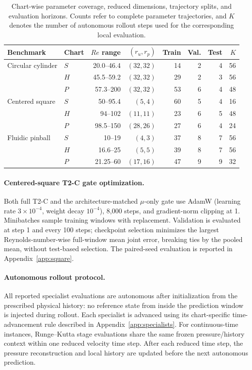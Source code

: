 \documentclass{article}
\begin{document}
\begin{table}[H]
\centering
\caption{
Chart-wise parameter coverage, reduced dimensions, trajectory splits, and evaluation horizons. Counts refer to complete parameter trajectories, and $K$ denotes the number of autonomous rollout steps used for the corresponding local evaluation.
}
\label{tab:chart_splits}
\small
\setlength{\tabcolsep}{3.5pt}
\begin{tabular}{@{}llrrrrrr@{}}
\toprule
Benchmark & Chart & $Re$ range & $(r_u,r_p)$ & Train & Val. & Test & $K$ \\
\midrule
Circular cylinder
& $S$ & 20.0--46.4 & $(32,32)$ & 14 & 2 & 4 & 56 \\
& $H$ & 45.5--59.2 & $(32,32)$ & 29 & 2 & 3 & 56 \\
& $P$ & 57.3--200 & $(32,32)$ & 53 & 6 & 4 & 48 \\
\addlinespace
Centered square
& $S$ & 50--95.4 & $(5,4)$ & 60 & 5 & 4 & 16 \\
& $H$ & 94--102 & $(11,11)$ & 23 & 6 & 5 & 48 \\
& $P$ & 98.5--150 & $(28,26)$ & 27 & 6 & 4 & 24 \\
\addlinespace
Fluidic pinball
& $S$ & 10--19 & $(4,3)$ & 37 & 8 & 7 & 56 \\
& $H$ & 16.6--25 & $(5,5)$ & 39 & 8 & 7 & 56 \\
& $P$ & 21.25--60 & $(17,16)$ & 47 & 9 & 9 & 32 \\
\bottomrule
\end{tabular}
\end{table}


\par


\paragraph{Centered-square T2-C gate optimization.}
Both full T2-C and the architecture-matched $\mu$-only gate use AdamW
(learning rate $3\times10^{-4}$, weight decay $10^{-4}$), 8,000 steps,
and gradient-norm clipping at 1. Minibatches sample training windows with
replacement. Validation is evaluated at step 1 and every 100 steps;
checkpoint selection minimizes the largest Reynolds-number-wise full-window mean joint
error, breaking ties by the pooled mean, without test-based selection.
The paired-seed evaluation is reported in Appendix~\ref{app:square}.



\paragraph{Autonomous rollout protocol.}
All reported specialist evaluations are autonomous after initialization from the prescribed physical history: no reference state from inside the prediction window is injected during rollout.
Each specialist is advanced using its chart-specific time-advancement rule described in Appendix~\ref{app:specialists}. For continuous-time instances, Runge--Kutta stage evaluations share the same frozen pressure/history context within one reduced velocity time step. After each reduced time step, the pressure reconstruction and local history are updated before the next autonomous prediction.
\end{document}
